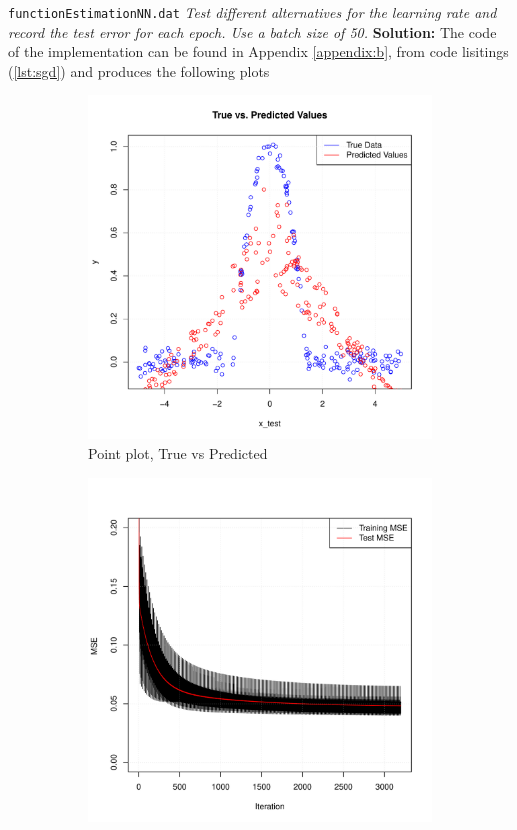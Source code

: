 \texttt{functionEstimationNN.dat} 
\emph{Test different alternatives for the learning rate and
record the test error for each epoch. Use a batch size of 50.} \spaze
\textbf{Solution:} \spaze
The code of the implementation can be found in Appendix \ref{appendix:b}, from code lisitings (\ref{lst:sgd}) and produces the following plots 
\begin{figure}[H]
\centering
\begin{subfigure}{0.32\textwidth}
  \centering
  \includegraphics[width=\linewidth]{Images/Figures_Exercise_5/True_v_Predict.pdf} 
  \caption{Point plot, True vs Predicted}
  \label{fig:point_pred_true}
\end{subfigure}
\hfill
\begin{subfigure}{0.32\textwidth}
  \centering
  \includegraphics[width=\linewidth]{Images/Figures_Exercise_5/MSE_train_test.pdf} 

\end{subfigure}
\end{figure}
